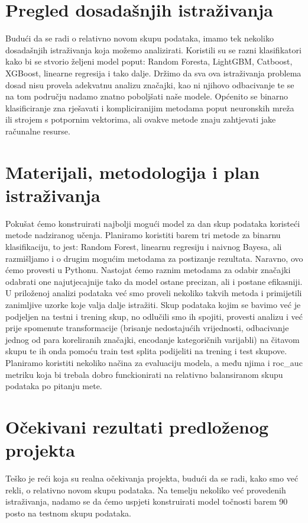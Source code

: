 \documentclass[a4paper,12pt]{article}
\begin{document}
\section{Pregled dosadašnjih istraživanja}
Budući da se radi o relativno novom skupu podataka, imamo tek nekoliko dosadašnjih istraživanja koja možemo analizirati. Koristili su se razni klasifikatori kako bi se stvorio željeni model poput: Random Foresta, LightGBM, Catboost, XGBoost, linearne regresija i tako dalje. Držimo da sva ova istraživanja problema dosad nisu provela adekvatnu analizu značajki, kao ni njihovo odbacivanje te se na tom području nadamo znatno poboljšati naše modele. Općenito se binarno klasificiranje zna rješavati i kompliciranijim metodama poput neuronskih mreža ili strojem s potpornim vektorima, ali ovakve metode znaju zahtjevati jake računalne resurse.

\newpage
\section{Materijali, metodologija i plan istraživanja}
Pokušat ćemo konstruirati najbolji mogući model za dan skup podataka koristeći metode nadziranog učenja. Planiramo koristiti barem tri metode za binarnu klasifikaciju, to jest: Random Forest, linearnu regresiju i naivnog Bayesa, ali razmišljamo i o drugim mogućim metodama za postizanje rezultata. Naravno, ovo ćemo provesti u Pythonu. Nastojat ćemo raznim metodama za odabir značajki odabrati one najutjecajnije tako da model ostane precizan, ali i postane efikasniji. U priloženoj analizi podataka već smo proveli nekoliko takvih metoda i primijetili zanimljive uzorke koje valja dalje istražiti. Skup podataka kojim se bavimo već je podjeljen na testni i trening skup, no odlučili smo ih spojiti, provesti analizu i već prije spomenute transformacije (brisanje nedostajućih vrijednosti, odbacivanje jednog od para koreliranih značajki, encodanje kategoričnih varijabli) na čitavom skupu te ih onda pomoću train test splita podijeliti na trening i test skupove. Planiramo koristiti nekoliko načina za evaluaciju modela, a među njima i roc\_auc metriku koja bi trebala dobro funckionirati na relativno balansiranom skupu podataka po pitanju mete.

\section{Očekivani rezultati predloženog projekta}
Teško je reći koja su realna očekivanja projekta, budući da se radi, kako smo već rekli, o relativno novom skupu podataka. Na temelju nekoliko već provedenih istraživanja, nadamo se da ćemo uspjeti konstruirati model točnosti barem 90 posto na testnom skupu podataka.
\end{document}
